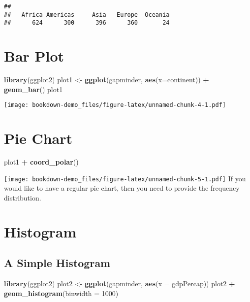 \documentclass[
]{book}
\newenvironment{Shaded}{\begin{snugshade}}{\end{snugshade}}
\newcommand{\DataTypeTok}[1]{\textcolor[rgb]{0.13,0.29,0.53}{#1}}
\newcommand{\DecValTok}[1]{\textcolor[rgb]{0.00,0.00,0.81}{#1}}
\newcommand{\KeywordTok}[1]{\textcolor[rgb]{0.13,0.29,0.53}{\textbf{#1}}}
\newcommand{\NormalTok}[1]{#1}
\newcommand{\OperatorTok}[1]{\textcolor[rgb]{0.81,0.36,0.00}{\textbf{#1}}}
\newcommand{\StringTok}[1]{\textcolor[rgb]{0.31,0.60,0.02}{#1}}
\begin{document}
\begin{verbatim}
## 
##   Africa Americas     Asia   Europe  Oceania 
##      624      300      396      360       24
\end{verbatim}

\hypertarget{bar-plot}{%
\section{Bar Plot}\label{bar-plot}}

\begin{Shaded}
\begin{Highlighting}[]
\KeywordTok{library}\NormalTok{(ggplot2)}
\NormalTok{plot1 <-}\StringTok{ }\KeywordTok{ggplot}\NormalTok{(gapminder, }\KeywordTok{aes}\NormalTok{(}\DataTypeTok{x=}\NormalTok{continent)) }\OperatorTok{+}\StringTok{ }\KeywordTok{geom_bar}\NormalTok{()}
\NormalTok{plot1}
\end{Highlighting}
\end{Shaded}

\texttt{[image: bookdown-demo\_files/figure-latex/unnamed-chunk-4-1.pdf]}

\hypertarget{pie-chart}{%
\section{Pie Chart}\label{pie-chart}}

\begin{Shaded}
\begin{Highlighting}[]
\NormalTok{plot1 }\OperatorTok{+}\StringTok{ }\KeywordTok{coord_polar}\NormalTok{()}
\end{Highlighting}
\end{Shaded}

\texttt{[image: bookdown-demo\_files/figure-latex/unnamed-chunk-5-1.pdf]}
If you would like to have a regular pie chart, then you need to provide the frequency distribution.

\hypertarget{histogram}{%
\section{Histogram}\label{histogram}}

\hypertarget{a-simple-histogram}{%
\subsection{A Simple Histogram}\label{a-simple-histogram}}

\begin{Shaded}
\begin{Highlighting}[]
\KeywordTok{library}\NormalTok{(ggplot2)}
\NormalTok{plot2 <-}\StringTok{ }\KeywordTok{ggplot}\NormalTok{(gapminder,}
                \KeywordTok{aes}\NormalTok{(}\DataTypeTok{x =}\NormalTok{ gdpPercap))}
\NormalTok{plot2 }\OperatorTok{+}\StringTok{ }\KeywordTok{geom_histogram}\NormalTok{(}\DataTypeTok{binwidth =} \DecValTok{1000}\NormalTok{)}
\end{Highlighting}
\end{Shaded}
\end{document}
